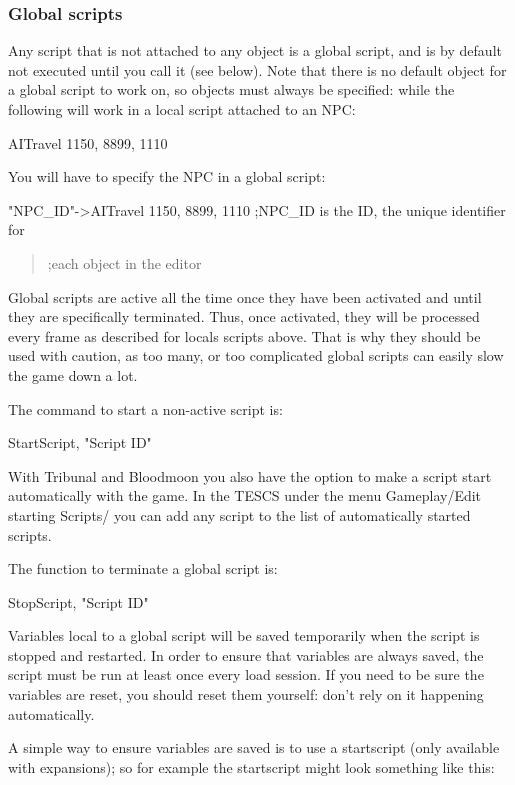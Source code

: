 \documentclass[
]{article}
\begin{document}
\hypertarget{global-scripts}{%
\subsubsection{Global scripts}\label{global-scripts}}

Any script that is not attached to any object is a global script, and is
by default not executed until you call it (see below). Note that there
is no default object for a global script to work on, so objects must
always be specified: while the following will work in a local script
attached to an NPC:

AITravel 1150, 8899, 1110

You will have to specify the NPC in a global script:

"NPC\_ID"-\textgreater AITravel 1150, 8899, 1110 ;NPC\_ID is the ID, the
unique identifier for

\begin{quote}
;each object in the editor
\end{quote}

Global scripts are active all the time once they have been activated and
until they are specifically terminated. Thus, once activated, they will
be processed every frame as described for locals scripts above. That is
why they should be used with caution, as too many, or too complicated
global scripts can easily slow the game down a lot.

The command to start a non-active script is:

StartScript, "Script ID"

With Tribunal and Bloodmoon you also have the option to make a script
start automatically with the game. In the TESCS under the menu
Gameplay/Edit starting Scripts/ you can add any script to the list of
automatically started scripts.

The function to terminate a global script is:

StopScript, "Script ID"

Variables local to a global script will be saved temporarily when the
script is stopped and restarted. In order to ensure that variables are
always saved, the script must be run at least once every load session.
If you need to be sure the variables are reset, you should reset them
yourself: don't rely on it happening automatically.

A simple way to ensure variables are saved is to use a startscript (only
available with expansions); so for example the startscript might look
something like this:
\end{document}
